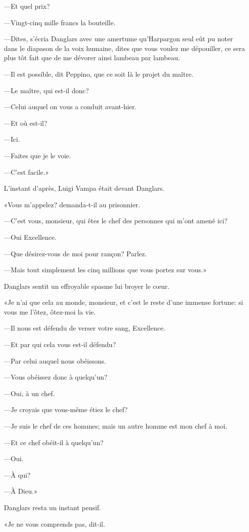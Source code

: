 —Et quel prix? 

—Vingt-cinq mille francs la bouteille. 

—Dites, s'écria Danglars avec une amertume qu'Harpargon seul eût pu noter dans le diapason de la voix humaine, dites que vous voulez me dépouiller, ce sera plus tôt fait que de me dévorer ainsi lambeau par lambeau. 

—Il est possible, dit Peppino, que ce soit là le projet du maître. 

—Le maître, qui est-il donc? 

—Celui auquel on vous a conduit avant-hier. 

—Et où est-il? 

—Ici. 

—Faites que je le voie. 

—C'est facile.» 

L'instant d'après, Luigi Vampa était devant Danglars. 

«Vous m'appelez? demanda-t-il au prisonnier. 

—C'est vous, monsieur, qui êtes le chef des personnes qui m'ont amené ici? 

—Oui Excellence. 

—Que désirez-vous de moi pour rançon? Parlez. 

—Mais tout simplement les cinq millions que vous portez sur vous.» 

Danglars sentit un effroyable spasme lui broyer le cœur. 

«Je n'ai que cela au monde, monsieur, et c'est le reste d'une immense fortune: si vous me l'ôtez, ôtez-moi la vie. 

—Il nous est défendu de verser votre sang, Excellence. 

—Et par qui cela vous est-il défendu? 

—Par celui auquel nous obéissons. 

—Vous obéissez donc à quelqu'un? 

—Oui, à un chef. 

—Je croyais que vous-même étiez le chef? 

—Je suis le chef de ces hommes; mais un autre homme est mon chef à moi. 

—Et ce chef obéit-il à quelqu'un? 

—Oui. 

—À qui? 

—À Dieu.» 

Danglars resta un instant pensif. 

«Je ne vous comprends pas, dit-il. 

